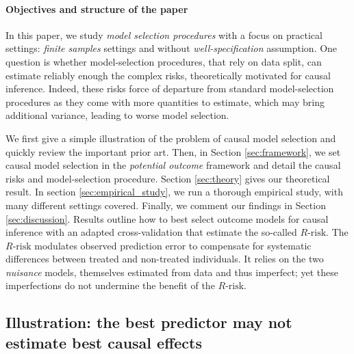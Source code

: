 \documentclass[10pt]{article}
\begin{document}
\begin{multicols}{2}
    \paragraph{Objectives and structure of the paper}

    In this paper, we study \textit{model selection procedures} with a focus
    on practical settings: \textit{finite samples} settings and without
    \textit{well-specification} assumption. One question is whether
    model-selection procedures, that rely on data split, can estimate
    reliably enough the complex risks, theoretically motivated for causal
    inference. Indeed, these risks force of departure from standard model-selection
    procedures as they come with more quantities to estimate, which may
    bring additional variance, leading to worse model selection.

    We first give a simple illustration of the problem of causal model
    selection and quickly review the important prior art. Then, in Section
    \ref{sec:framework}, we set causal model selection in the
    \emph{potential outcome} framework and detail the causal risks and
    model-selection procedure. Section \ref{sec:theory} gives our theoretical
    result. In section \ref{sec:empirical_study}, we run a thorough empirical
    study, with many different settings covered. Finally, we comment our
    findings in Section \ref{sec:discussion}.
    Results outline how to best select outcome models for causal
    inference with an adapted
    cross-validation that estimate the so-called $R\text{-risk}$.
    The $R\text{-risk}$
    modulates observed prediction error to compensate for systematic
    differences between treated and non-treated individuals. It
    relies on the two \emph{nuisance} models,
    themselves estimated from data and thus imperfect; yet these
    imperfections do not undermine the benefit of the $R\text{-risk}$.



    \subsection{Illustration: the best predictor may not estimate best causal
        effects}%


\end{multicols}
\end{document}
